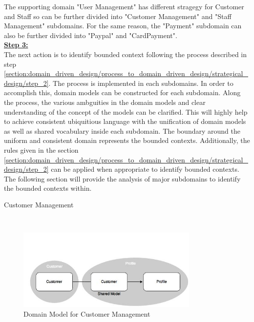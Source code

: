 The supporting domain "User Management" has different stragegy for Customer and Staff so can be further divided into "Customer Management" and "Staff Management" subdomains. For the same reason, the "Payment" subdomain can also be further divided into "Paypal" and "CardPayment".
\\
\textbf{\underline{Step 3:}}
\\
The next action is to identify bounded context following the process described in step \ref{section:domain_driven_design/process_to_domain_driven_design/strategical_design/step_2}. The process is implemented in each subdomains. In order to accomplish this, domain models can be constructed for each subdomain. Along the process, the various ambguities in the domain models and clear understanding of the concept of the models can be clarified. This will highly help to achieve consistent ubiquitious language with the unification of domain models as well as shared vocabulary inside each subdomain. The boundary around the uniform and consistent domain represents the bounded contexts. Additionally, the rules given in the section \ref{section:domain_driven_design/process_to_domain_driven_design/strategical_design/step_2} can be applied when appropriate to identify bounded contexts.
The following section will provide the analysis of major subdomains to identify the bounded contexts within.\\
\begin{shaded} Customer Management \end{shaded}
\\
\begin{figure}[H]
\begin{center}
\includegraphics[width=0.8\textwidth]{figures/domain-driven-design-two}
\caption{Domain Model for Customer Management}
\label{fig:domain_driven_design/example_scenario/subdomains/Customer}
\end{center}
\end{figure}
\\
